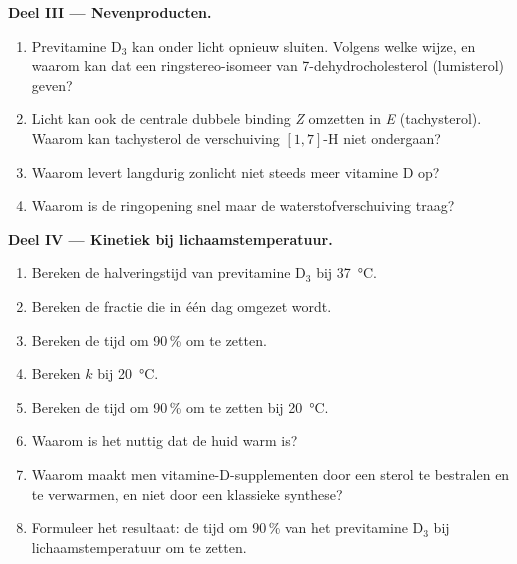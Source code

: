 \begin{problem}
\medskip\noindent\textbf{Deel III --- Nevenproducten.}
\begin{enumerate}[resume]
  \item Previtamine D$_3$ kan onder licht opnieuw sluiten. Volgens welke wijze, en waarom kan dat een
        ringstereo-isomeer van 7-dehydrocholesterol (lumisterol) geven?
  \item Licht kan ook de centrale dubbele binding \textit{Z} omzetten in \textit{E} (tachysterol). Waarom
        kan tachysterol de verschuiving $[1,7]$-H niet ondergaan?
  \item Waarom levert langdurig zonlicht niet steeds meer vitamine D op?
  \item Waarom is de ringopening snel maar de waterstofverschuiving traag?
\end{enumerate}

\medskip\noindent\textbf{Deel IV --- Kinetiek bij lichaamstemperatuur.}
\begin{enumerate}[resume]
  \item Bereken de halveringstijd van previtamine D$_3$ bij \qty{37}{\celsius}.
  \item Bereken de fractie die in één dag omgezet wordt.
  \item Bereken de tijd om 90\,\% om te zetten.
  \item Bereken $k$ bij \qty{20}{\celsius}.
  \item Bereken de tijd om 90\,\% om te zetten bij \qty{20}{\celsius}.
  \item Waarom is het nuttig dat de huid warm is?
  \item Waarom maakt men vitamine-D-supplementen door een sterol te
        bestralen en te verwarmen, en niet door een klassieke synthese?
  \item Formuleer het resultaat: de tijd om 90\,\% van het previtamine D$_3$ bij lichaamstemperatuur om te zetten.
\end{enumerate}
\end{problem}
